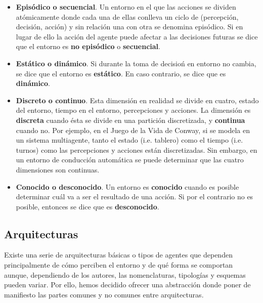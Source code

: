 \begin{itemize}
\begin{marginfigure}
\end{marginfigure}
	\item \textbf{Episódico o secuencial}. Un entorno en el que las acciones se dividen atómicamente donde cada una de ellas conlleva un ciclo de (percepción, decisión, acción) y sin relación una con otra se denomina episódico. Si en lugar de ello la acción del agente puede afectar a las decisiones futuras se dice que el entorno es \textbf{no episódico} o \textbf{secuencial}.
	\item \textbf{Estático o dinámico}. Si durante la toma de decisioń en entorno no cambia, se dice que el entorno es \textbf{estático}. En caso contrario, se dice que es \textbf{dinámico}.
	\item \textbf{Discreto o continuo}. Esta dimensión en realidad se divide en cuatro, estado del entorno, tiempo en el entorno, percepciones y acciones. La dimensión es \textbf{discreta} cuando ésta se divide en una partición discretizada, y \textbf{continua} cuando no. Por ejemplo, en el Juego de la Vida de Conway, si se modela en un sistema multiagente, tanto el estado (i.e. tablero) como el tiempo (i.e. turnos) como las percepciones y acciones están discretizadas. Sin embargo, en un entorno de conducción automática se puede determinar que las cuatro dimensiones son continuas.
	\item \textbf{Conocido o desconocido}. Un entorno es \textbf{conocido} cuando es posible determinar cuál va a ser el resultado de una acción. Si por el contrario no es posible, entonces se dice que es \textbf{desconocido}.
\end{itemize}

\subsection{Arquitecturas}

Existe una serie de arquitecturas básicas o tipos de agentes que dependen principalmente de cómo perciben el entorno y de qué forma se comportan aunque, dependiendo de los autores, las nomenclaturas, tipologías y esquemas pueden variar. Por ello, hemos decidido ofrecer una abstracción donde poner de manifiesto las partes comunes y no comunes entre arquitecturas.

